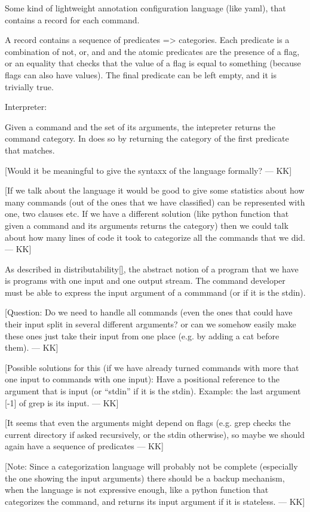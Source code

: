 \documentclass[sigplan,10pt,review,anonymous]{acmart}
\newcommand{\kk}[1]{[{\color{magenta}#1 --- KK}]}
\begin{document}
Some kind of lightweight annotation configuration language (like
yaml), that contains a record for each command.

A record contains a sequence of predicates => categories. Each
predicate is a combination of not, or, and and the atomic predicates
are the presence of a flag, or an equality that checks that the value
of a flag is equal to something (because flags can also have
values). The final predicate can be left empty, and it is trivially true.

Interpreter:

Given a command and the set of its arguments, the intepreter returns
the command category. In does so by returning the category of the first
predicate that matches.

\kk{Would it be meaningful to give the syntaxx of the language
  formally?}

\kk{If we talk about the language it would be good to give some
  statistics about how many commands (out of the ones that we have
  classified) can be represented with one, two clauses etc. If we have
  a different solution (like python function that given a command and
  its arguments returns the category) then we could talk about how
  many lines of code it took to categorize all the commands that we
  did.}

As described in distributability\ref{}, the abstract notion of a
program that we have is programs with one input and one output
stream. The command developer must be able to express the input
argument of a commmand (or if it is the stdin).

\kk{Question: Do we need to handle all commands (even the ones that
  could have their input split in several different arguments? or can
  we somehow easily make these ones just take their input from one
  place (e.g. by adding a cat before them).}

\kk{Possible solutions for this (if we have already turned commands
  with more that one input to commands with one input): Have a
  positional reference to the argument that is input (or ``stdin'' if
  it is the stdin). Example: the last argument [-1] of grep is its
  input.}

\kk{It seems that even the arguments might depend on flags (e.g. grep
  checks the current directory if asked recursively, or the stdin
  otherwise), so maybe we should again have a sequence of predicates}


\kk{Note: Since a categorization language will probably not be
  complete (especially the one showing the input arguments) there
  should be a backup mechanism, when the language is not expressive
  enough, like a python function that categorizes the command, and
  returns its input argument if it is stateless.}
\end{document}
